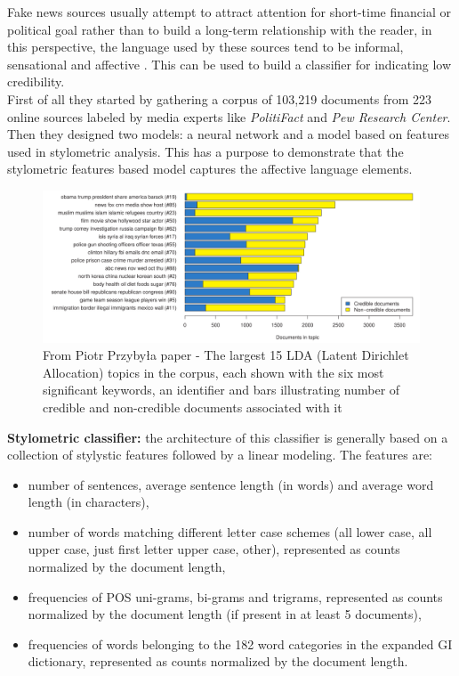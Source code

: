 \documentclass[10pt, english]{report}
\begin{document}
Fake news sources usually attempt to attract attention for short-time financial or political goal \cite{allcott2017social} rather than to build a long-term relationship with the reader, in this perspective, the language used by these sources tend to be informal, sensational and affective \cite{bakir2017fake}. This can be used to build a classifier for indicating low credibility.\\

First of all they started by gathering a corpus of 103,219 documents from 223 online sources labeled by media experts like \textit{PolitiFact} and \textit{Pew Research Center}. Then they designed two models: a neural network and a model based on features used in stylometric analysis. This has a purpose to demonstrate that the stylometric features based model captures the affective language elements.\\

\begin{figure}[H]
	\centering
	\includegraphics[scale=0.4]{img/documents_in_topic.png}
	\caption{From Piotr Przybyła paper - The largest 15 LDA (Latent Dirichlet Allocation) topics in the corpus, each shown with the six most signiﬁcant keywords, an identiﬁer and bars illustrating number of credible and non-credible documents associated with it}
\end{figure}

\textbf{Stylometric classifier:} the architecture of this classifier is generally based on a collection of stylystic features followed by a linear modeling. The features are: 
	\begin{itemize}
	\item number of sentences, average sentence length (in words) and average word length (in characters),
	\item number of words matching different letter case schemes (all lower case, all upper case, just first letter upper case, other), represented as counts normalized by the document length,
	\item frequencies of POS uni-grams, bi-grams and trigrams, represented as counts normalized by the document length (if present in at least 5 documents),
	\item frequencies of words belonging to the 182 word categories in the expanded GI dictionary, represented as counts normalized by the document length.
	\end{itemize}
\end{document}
